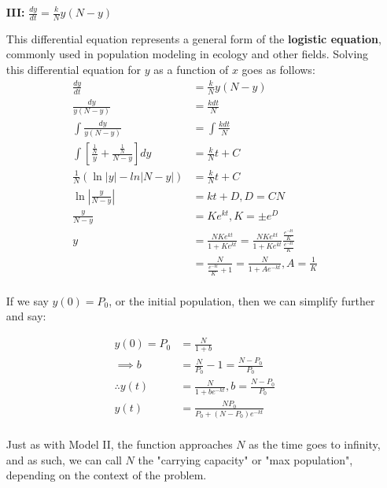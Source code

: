 \documentclass[12pt]{article}
\begin{document}
\begin{itemize}
    \item[\textbf{III:}] $\frac{dy}{dt} = \frac{k}{N}y(N-y)$
    
    This differential equation represents a general form of the \textbf{logistic equation}, commonly used in population modeling in ecology and other fields. Solving this differential equation for $y$ as a function of $x$ goes as follows:
    \begin{equation}
        \begin{split}
            \frac{dy}{dt} &= \frac{k}{N}y(N-y)\\
            \frac{dy}{y(N-y)} &= \frac{k dt}{N}\\
            \int \frac{dy}{y(N-y)} &= \int \frac{k dt}{N}\\
            \int [\frac{\frac{1}{N}}{y} + \frac{\frac{1}{N}}{N-y}] dy &= \frac{k}{N} t + C\\
            \frac{1}{N}(\ln|y| - ln|N-y|) &= \frac{k}{N} t + C\\
            \ln|\frac{y}{N-y}| &= kt + D, D = CN\\
            \frac{y}{N-y} &= Ke^{kt}, K = \pm e^D\\
            y &= \frac{NKe^{kt}}{1+Ke^{kt}} =\frac{NKe^{kt}}{1+Ke^{kt}} \frac{\frac{e^{-kt}}{K}}{\frac{e^{-kt}}{K}}\\
            &= \frac{N}{\frac{e^{-kt}}{K} + 1} = \frac{N}{1+Ae^{-kt}}, A = \frac{1}{K}\\
        \end{split}
    \end{equation}

    If we say $y(0) = P_0$, or the initial population, then we can simplify further and say:

    \begin{equation}
        \begin{split}
            y(0) = P_0 &= \frac{N}{1+b}\\
            \implies b &= \frac{N}{P_0} - 1 = \frac{N-P_0}{P_0}\\
            \therefore y(t) &= \frac{N}{1+be^{-kt}}, b = \frac{N-P_0}{P_0}\\
            y(t) &= \frac{NP_0}{P_0 + (N-P_0)e^{-kt}}\\
        \end{split}
    \end{equation}

    Just as with Model II, the function approaches $N$ as the time goes to infinity, and as such, we can call $N$ the "carrying capacity" or "max population", depending on the context of the problem.


\end{itemize}
\end{document}
